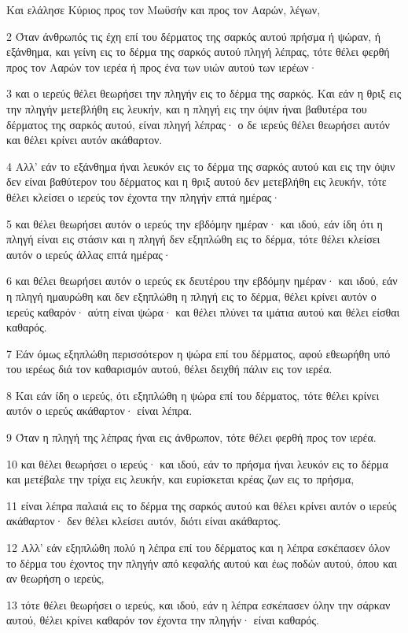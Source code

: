 \par Και ελάλησε Κύριος προς τον Μωϋσήν και προς τον Ααρών, λέγων,
\par 2 Όταν άνθρωπός τις έχη επί του δέρματος της σαρκός αυτού πρήσμα ή ψώραν, ή εξάνθημα, και γείνη εις το δέρμα της σαρκός αυτού πληγή λέπρας, τότε θέλει φερθή προς τον Ααρών τον ιερέα ή προς ένα των υιών αυτού των ιερέων·
\par 3 και ο ιερεύς θέλει θεωρήσει την πληγήν εις το δέρμα της σαρκός. Και εάν η θριξ εις την πληγήν μετεβλήθη εις λευκήν, και η πληγή εις την όψιν ήναι βαθυτέρα του δέρματος της σαρκός αυτού, είναι πληγή λέπρας· ο δε ιερεύς θέλει θεωρήσει αυτόν και θέλει κρίνει αυτόν ακάθαρτον.
\par 4 Αλλ' εάν το εξάνθημα ήναι λευκόν εις το δέρμα της σαρκός αυτού και εις την όψιν δεν είναι βαθύτερον του δέρματος και η θριξ αυτού δεν μετεβλήθη εις λευκήν, τότε θέλει κλείσει ο ιερεύς τον έχοντα την πληγήν επτά ημέρας·
\par 5 και θέλει θεωρήσει αυτόν ο ιερεύς την εβδόμην ημέραν· και ιδού, εάν ίδη ότι η πληγή είναι εις στάσιν και η πληγή δεν εξηπλώθη εις το δέρμα, τότε θέλει κλείσει αυτόν ο ιερεύς άλλας επτά ημέρας·
\par 6 και θέλει θεωρήσει αυτόν ο ιερεύς εκ δευτέρου την εβδόμην ημέραν· και ιδού, εάν η πληγή ημαυρώθη και δεν εξηπλώθη η πληγή εις το δέρμα, θέλει κρίνει αυτόν ο ιερεύς καθαρόν· αύτη είναι ψώρα· και θέλει πλύνει τα ιμάτια αυτού και θέλει είσθαι καθαρός.
\par 7 Εάν όμως εξηπλώθη περισσότερον η ψώρα επί του δέρματος, αφού εθεωρήθη υπό του ιερέως διά τον καθαρισμόν αυτού, θέλει δειχθή πάλιν εις τον ιερέα.
\par 8 Και εάν ίδη ο ιερεύς, ότι εξηπλώθη η ψώρα επί του δέρματος, τότε θέλει κρίνει αυτόν ο ιερεύς ακάθαρτον· είναι λέπρα.
\par 9 Όταν η πληγή της λέπρας ήναι εις άνθρωπον, τότε θέλει φερθή προς τον ιερέα.
\par 10 και θέλει θεωρήσει ο ιερεύς· και ιδού, εάν το πρήσμα ήναι λευκόν εις το δέρμα και μετέβαλε την τρίχα εις λευκήν, και ευρίσκεται κρέας ζων εις το πρήσμα,
\par 11 είναι λέπρα παλαιά εις το δέρμα της σαρκός αυτού και θέλει κρίνει αυτόν ο ιερεύς ακάθαρτον· δεν θέλει κλείσει αυτόν, διότι είναι ακάθαρτος.
\par 12 Αλλ' εάν εξηπλώθη πολύ η λέπρα επί του δέρματος και η λέπρα εσκέπασεν όλον το δέρμα του έχοντος την πληγήν από κεφαλής αυτού και έως ποδών αυτού, όπου και αν θεωρήση ο ιερεύς,
\par 13 τότε θέλει θεωρήσει ο ιερεύς, και ιδού, εάν η λέπρα εσκέπασεν όλην την σάρκαν αυτού, θέλει κρίνει καθαρόν τον έχοντα την πληγήν· είναι καθαρός.

